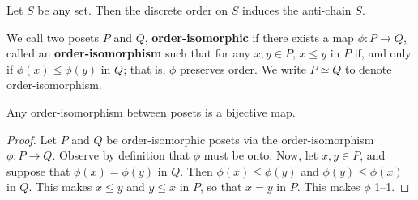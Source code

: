 \begin{lemma}\label{lemma_1.1.3}
  Let $S$ be any set. Then the discrete order on $S$ induces the
  anti-chain $S$.
\end{lemma}

\begin{definition}
  We call two posets $P$ and $Q$, \textbf{order-isomorphic} if there
  exists a map $\phi:P \xrightarrow{} Q$, called an
  \textbf{order-isomorphism} such that for any $x,y \in
  P$, $x \leq y$ in $P$ if, and only if  $\phi(x) \leq \phi(y)$ in
  $Q$; that is, $\phi$ preserves order. We write $P \simeq Q$ to denote
  order-isomorphism.
\end{definition}

\begin{lemma}\label{lemma_1.1.4}
  Any order-isomorphism between posets is a bijective map.
\end{lemma}
\begin{proof}
  Let $P$ and $Q$ be order-isomorphic posets via the order-isomorphism
  $\phi:P \xrightarrow{} Q$. Observe by definition that $\phi$ must be
  onto. Now, let $x,y \in P$, and suppose that $\phi(x)=\phi(y)$ in
  $Q$. Then  $\phi(x) \leq \phi(y)$ and $\phi(y) \leq \phi(x)$ in $Q$.
  This makes $x \leq y$ and $y \leq x$ in $P$, so that $x=y$ in  $P$.
  This makes $\phi$ 1--1.
\end{proof}


